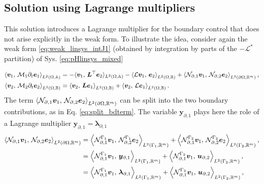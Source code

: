 \subsection{Solution using Lagrange multipliers}\label{sec:lagrMul}
This solution introduces a Lagrange multiplier for the boundary control that does not arise explicitly in the weak form. To illustrate the idea, consider again the weak form \ref{eq:weak_linsys_intJ1} (obtained by integration by parts of the $\mathcal{-L^*}$ partition) of Sys. \ref{eq:pHlinsys_mixed}

\begin{equation}\label{eq:pHlinsys_mixed_weak}
\begin{aligned}
\inner[L^2(\Omega, \mathbb{A})]{\bm{v}_1}{\mathcal{M}_1 \partial_t \bm{e}_1} &=   -  \langle{\bm{v}_1}, \,{\bm{L}^\top \bm{e}_2}\rangle_{L^2(\Omega, \mathbb{A})}  -\inner[L^2(\Omega, \mathbb{B})]{\mathcal{L}\bm{v}_1}{\bm{e}_2} + \inner[L^2({\partial\Omega}, \mathbb{R}^m)]{\mathcal{N}_{\partial, 1} \bm{v}_1}{\mathcal{N}_{\partial, 2}\bm{e}_2}, \\
\inner[L^2(\Omega, \mathbb{B})]{\bm{v}_2}{\mathcal{M}_2 \partial_t \bm{e}_2} &=   \inner[L^2(\Omega, \mathbb{B})]{\bm{v}_2}{\bm{L}\bm{e}_1} + \inner[L^2(\Omega, \mathbb{B})]{\bm{v}_2}{\mathcal{L}\bm{e}_1}. \\
\end{aligned}
\end{equation}
The term $\inner[L^2({\partial\Omega}, \mathbb{R}^m)]{\mathcal{N}_{\partial, 1} \bm{v}_1}{\mathcal{N}_{\partial, 2}\bm{e}_2}$ can be split into the two boundary contributions, as in Eq. \eqref{eq:split_bdterm}. The variable  $\bm{y}_{\partial, 1}$ plays here the role of a Lagrange multiplier $\bm{y}_{\partial, 1}=\bm{\lambda}_{\partial, 1}$
\begin{equation}\label{eq:bdterm_mixed}
\begin{aligned}
\inner[L^2({\partial\Omega}, \mathbb{R}^m)]{\mathcal{N}_{\partial, 1} \bm{v}_1}{\mathcal{N}_{\partial, 2}\bm{e}_2} &= \inner[L^2(\Gamma_1, \mathbb{R}^m)]{\mathcal{N}_{\partial, 1}^{\Gamma_1}\bm{v}_1}{\mathcal{N}_{\partial, 2}^{\Gamma_1}\bm{e}_2} + \inner[L^2(\Gamma_2, \mathbb{R}^m)]{\mathcal{N}_{\partial, 1}^{\Gamma_2}\bm{v}_1}{\mathcal{N}_{\partial, 2}^{\Gamma_2}\bm{e}_2}, \\
&= \inner[L^2(\Gamma_1, \mathbb{R}^m)]{\mathcal{N}_{\partial, 1}^{\Gamma_1}\bm{v}_1}{\bm{y}_{\partial, 1}} + \inner[L^2(\Gamma_2, \mathbb{R}^m)]{\mathcal{N}_{\partial, 1}^{\Gamma_2}\bm{v}_1}{\bm{u}_{\partial, 2}}, \\
&= \inner[L^2(\Gamma_1, \mathbb{R}^m)]{\mathcal{N}_{\partial, 1}^{\Gamma_1}\bm{v}_1}{\bm{\lambda}_{\partial, 1}} + \inner[L^2(\Gamma_2, \mathbb{R}^m)]{\mathcal{N}_{\partial, 1}^{\Gamma_2}\bm{v}_1}{\bm{u}_{\partial, 2}}, \\
\end{aligned}
\end{equation}
